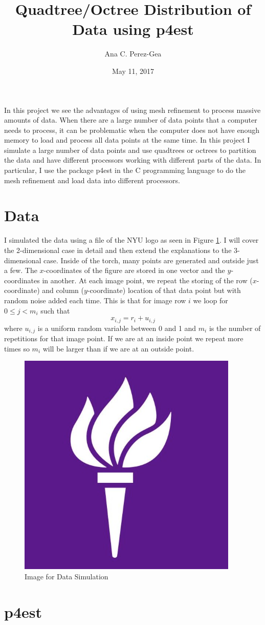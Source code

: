 \documentclass[12pt,letterpaper]{article}
\title{Quadtree/Octree Distribution of Data using p4est}
\author{Ana C. Perez-Gea}
\date{May 11, 2017}
\begin{document}
\maketitle

In this project we see the advantages of using mesh refinement to process massive amounts of data. When there are a large number of data points that a computer needs to process, it can be problematic when the computer does not have enough memory to load and process all data points at the same time. In this project I simulate a large number of data points and use quadtrees or octrees to partition the data and have different processors working with different parts of the data.  In particular, I use the package p4est in the C programming language to do the mesh refinement and load data into different processors.

\section{Data}

I simulated the data using a file of the NYU logo as seen in Figure \ref{nyu_logo}. I will cover the 2-dimensional case in detail and then extend the explanations to the 3-dimensional case. Inside of the torch, many points are generated and outside just a few. The $x$-coordinates of the figure are stored in one vector and the $y$-coordinates in another. At each image point, we repeat the storing of the row ($x$-coordinate) and column ($y$-coordinate) location of that data point but with random noise added each time. This is that for image row $i$ we loop for $0\leq j< m_i$ such that \[x_{i,j} = r_i + u_{i,j}\] where $u_{i,j}$ is a uniform random variable between 0 and 1 and $m_i$ is the number of repetitions for that image point. If we are at an inside point we repeat more times so $m_i$ will be larger than if we are at an outside point.

\begin{figure}[h]
\centering
\caption{Image for Data Simulation}
\label{nyu_logo}
\includegraphics[width=.2\textwidth]{NYU_logo}
\end{figure}

\section{p4est}
\end{document}

